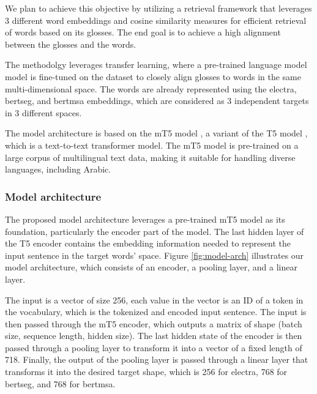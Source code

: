 \documentclass[12pt]{article}
\begin{document}
We plan to achieve this objective by utilizing a retrieval framework that leverages 3 different word embeddings and cosine similarity measures for efficient retrieval of words based on its glosses. The end goal is to achieve a high alignment between the glosses and the words.

The methodolgy leverages transfer learning, where a pre-trained language model model is fine-tuned on the dataset to closely align glosses to words in the same multi-dimensional space. The words are already represented using the electra, bertseg, and bertmsa embeddings, which are considered as 3 independent targets in 3 different spaces.

The model architecture is based on the mT5 model \cite{Linting2021}, a variant of the T5 model \cite{Raffel2019}, which is a text-to-text transformer model. The mT5 model is pre-trained on a large corpus of multilingual text data, making it suitable for handling diverse languages, including Arabic.

\subsubsection{Model architecture}

The proposed model architecture leverages a pre-trained mT5 model as its foundation, particularly the encoder part of the model. The last hidden layer of the T5 encoder contains the embedding information needed to represent the input sentence in the target words’ space. Figure \ref{fig:model-arch} illustrates our model architecture, which consists of an encoder, a pooling layer, and a linear layer.

The input is a vector of size 256, each value in the vector is an ID of a token in the vocabulary, which is the tokenized and encoded input sentence. The input is then passed through the mT5 encoder, which outputs a matrix of shape (batch size, sequence length, hidden size). The last hidden state of the encoder is then passed through a pooling layer to transform it into a vector of a fixed length of 718. Finally, the output of the pooling layer is passed through a linear layer that transforms it into the desired target shape, which is 256 for electra, 768 for bertseg, and 768 for bertmsa.
\end{document}
